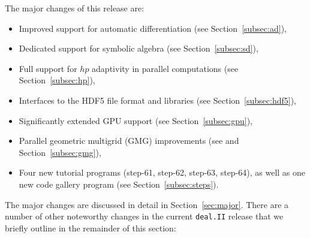 \documentclass{ansarticle-preprint}
\newcommand{\specialword}[1]{\texttt{#1}}
\newcommand{\dealii}{{\specialword{deal.II}}\xspace}
\begin{document}
The major changes of this release are:
%
\begin{itemize}
  \item Improved support for automatic differentiation (see
    Section~\ref{subsec:ad}),
  \item Dedicated support for symbolic algebra (see
    Section~\ref{subsec:sd}),
  \item Full support for $hp$ adaptivity in parallel computations (see
    Section~\ref{subsec:hp}),
  \item Interfaces to the HDF5 file format and libraries (see
    Section~\ref{subsec:hdf5}),
  \item Significantly extended GPU support (see Section~\ref{subsec:gpu}),
  \item Parallel geometric multigrid (GMG) improvements (see
    \cite{ClevengerHeisterKanschatKronbichler2019} and
    Section~\ref{subsec:gmg}),
  \item Four new tutorial programs (step-61, step-62, step-63, step-64),
    as well as one new code gallery program (see
    Section~\ref{subsec:steps}).
\end{itemize}
%
The major changes are discussed in detail in Section~\ref{sec:major}. There
are a number of other noteworthy changes in the current \dealii{} release
that we briefly outline in the remainder of this section:
%
\end{document}
